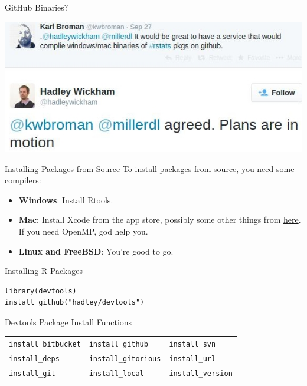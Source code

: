 \begin{frame}
  \begin{block}{GitHub Binaries?}
    \begin{center}
      \includegraphics{pics/plans}
    \end{center}
  \end{block}
\end{frame}


\begin{frame}
  \begin{block}{Installing Packages from Source}
  To install packages from source, you need some compilers:
  \begin{itemize}
    \item \textbf{Windows}: Install 
\href{http://cran.r-project.org/bin/windows/Rtools/}{Rtools}.
    \item \textbf{Mac}: Install Xcode from the app store, possibly some other 
things from \href{http://cran.r-project.org/bin/macosx/tools/}{here}.  If 
you need OpenMP, god help you.
    \item \textbf{Linux and FreeBSD}:  You're good to go.
  \end{itemize}
  \end{block}
\end{frame}


\begin{frame}[fragile]
  \begin{block}{Installing R Packages}
\begin{lstlisting}
library(devtools)
install_github("hadley/devtools")
\end{lstlisting}

  \begin{center}
  Devtools Package Install Functions
    \begin{tabular}{lll}\hline
      \texttt{install\_bitbucket} & \texttt{install\_github}   &  
\texttt{install\_svn}        \\
      \texttt{install\_deps}    &   \texttt{install\_gitorious} & 
\texttt{install\_url}      \\  
      \texttt{install\_git}     &   \texttt{install\_local}   &   
\texttt{install\_version}  \\\hline
    \end{tabular}
  \end{center}
  \end{block}
\end{frame}

